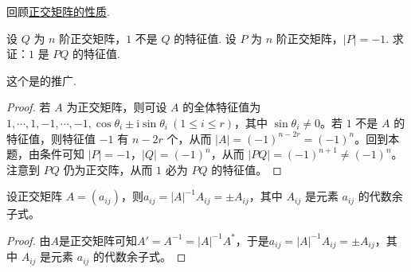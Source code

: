 \documentclass[../../main.tex]{subfiles}
\begin{document}
回顾\hyperref[theorem:正交矩阵的基本性质1]{正交矩阵的性质}.

\begin{proposition}\label{proposition:例9.44的推广}
设 \(Q\) 为 \(n\) 阶正交矩阵，\(1\) 不是 \(Q\) 的特征值. 设 \(P\) 为 \(n\) 阶正交矩阵，\(\vert P\vert = - 1\). 求证：\(1\) 是 \(PQ\) 的特征值.
\end{proposition}
\begin{remark}
这个是的推广.
\end{remark}
\begin{proof}
若 \(A\) 为正交矩阵，则可设 \(A\) 的全体特征值为 \(1,\cdots,1,-1,\cdots,-1,\cos\theta_i\pm\mathrm{i}\sin\theta_i\ (1\leq i \leq r)\)，其中 \(\sin\theta_i\neq0\)。若 \(1\) 不是 \(A\) 的特征值，则特征值 \(-1\) 有 \(n - 2r\) 个，从而 \(\vert A\vert = (-1)^{n - 2r}=(-1)^n\)。回到本题，由条件可知 \(\vert P\vert = - 1\)，\(\vert Q\vert = (-1)^n\)，从而 \(\vert PQ\vert = (-1)^{n + 1}\neq(-1)^n\)。注意到 \(PQ\) 仍为正交阵，从而 \(1\) 必为 \(PQ\) 的特征值。
\end{proof}

\begin{proposition}\label{proposition:正交阵元素的性质}
设正交矩阵 \(A = (a_{ij})\)，则\(a_{ij} = \vert A\vert^{-1}A_{ij} = \pm A_{ij}\)，其中 \(A_{ij}\) 是元素 \(a_{ij}\) 的代数余子式。
\end{proposition}
\begin{proof}
由$A$是正交矩阵可知\(A' = A^{-1} = \vert A\vert^{-1}A^*\)，于是\(a_{ij} = \vert A\vert^{-1}A_{ij} = \pm A_{ij}\)，其中 \(A_{ij}\) 是元素 \(a_{ij}\) 的代数余子式。
\end{proof}
\end{document}
